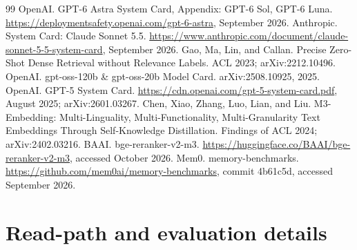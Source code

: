 \documentclass{article}
\begin{document}
\begin{thebibliography}{99}
 OpenAI. GPT-6 Astra System Card, Appendix: GPT-6 Sol, GPT-6 Luna. \url{https://deploymentsafety.openai.com/gpt-6-astra}, September 2026.
 Anthropic. System Card: Claude Sonnet 5.5. \url{https://www.anthropic.com/document/claude-sonnet-5-5-system-card}, September 2026.
 Gao, Ma, Lin, and Callan. Precise Zero-Shot Dense Retrieval without Relevance Labels. ACL 2023; arXiv:2212.10496.
 OpenAI. gpt-oss-120b \& gpt-oss-20b Model Card. arXiv:2508.10925, 2025.
 OpenAI. GPT-5 System Card. \url{https://cdn.openai.com/gpt-5-system-card.pdf}, August 2025; arXiv:2601.03267.
 Chen, Xiao, Zhang, Luo, Lian, and Liu. M3-Embedding: Multi-Linguality, Multi-Functionality, Multi-Granularity Text Embeddings Through Self-Knowledge Distillation. Findings of ACL 2024; arXiv:2402.03216.
 BAAI. bge-reranker-v2-m3. \url{https://huggingface.co/BAAI/bge-reranker-v2-m3}, accessed October 2026.
 Mem0. memory-benchmarks. \url{https://github.com/mem0ai/memory-benchmarks}, commit 4b61c5d, accessed September 2026.
\end{thebibliography}

\appendix
\section{Read-path and evaluation details}\label{app:hyper}
\end{document}

